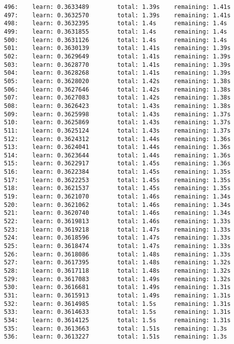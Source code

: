 \documentclass[11pt]{article}
\begin{document}
\begin{Verbatim}[commandchars=\\\{\}]
496:    learn: 0.3633489        total: 1.39s    remaining: 1.41s
497:    learn: 0.3632570        total: 1.39s    remaining: 1.41s
498:    learn: 0.3632395        total: 1.4s     remaining: 1.4s
499:    learn: 0.3631855        total: 1.4s     remaining: 1.4s
500:    learn: 0.3631126        total: 1.4s     remaining: 1.4s
501:    learn: 0.3630139        total: 1.41s    remaining: 1.39s
502:    learn: 0.3629649        total: 1.41s    remaining: 1.39s
503:    learn: 0.3628770        total: 1.41s    remaining: 1.39s
504:    learn: 0.3628268        total: 1.41s    remaining: 1.39s
505:    learn: 0.3628020        total: 1.42s    remaining: 1.38s
506:    learn: 0.3627646        total: 1.42s    remaining: 1.38s
507:    learn: 0.3627083        total: 1.42s    remaining: 1.38s
508:    learn: 0.3626423        total: 1.43s    remaining: 1.38s
509:    learn: 0.3625998        total: 1.43s    remaining: 1.37s
510:    learn: 0.3625869        total: 1.43s    remaining: 1.37s
511:    learn: 0.3625124        total: 1.43s    remaining: 1.37s
512:    learn: 0.3624312        total: 1.44s    remaining: 1.36s
513:    learn: 0.3624041        total: 1.44s    remaining: 1.36s
514:    learn: 0.3623644        total: 1.44s    remaining: 1.36s
515:    learn: 0.3622917        total: 1.45s    remaining: 1.36s
516:    learn: 0.3622384        total: 1.45s    remaining: 1.35s
517:    learn: 0.3622253        total: 1.45s    remaining: 1.35s
518:    learn: 0.3621537        total: 1.45s    remaining: 1.35s
519:    learn: 0.3621070        total: 1.46s    remaining: 1.34s
520:    learn: 0.3621062        total: 1.46s    remaining: 1.34s
521:    learn: 0.3620740        total: 1.46s    remaining: 1.34s
522:    learn: 0.3619813        total: 1.46s    remaining: 1.33s
523:    learn: 0.3619218        total: 1.47s    remaining: 1.33s
524:    learn: 0.3618596        total: 1.47s    remaining: 1.33s
525:    learn: 0.3618474        total: 1.47s    remaining: 1.33s
526:    learn: 0.3618086        total: 1.48s    remaining: 1.33s
527:    learn: 0.3617395        total: 1.48s    remaining: 1.32s
528:    learn: 0.3617118        total: 1.48s    remaining: 1.32s
529:    learn: 0.3617083        total: 1.49s    remaining: 1.32s
530:    learn: 0.3616681        total: 1.49s    remaining: 1.31s
531:    learn: 0.3615913        total: 1.49s    remaining: 1.31s
532:    learn: 0.3614985        total: 1.5s     remaining: 1.31s
533:    learn: 0.3614633        total: 1.5s     remaining: 1.31s
534:    learn: 0.3614125        total: 1.5s     remaining: 1.31s
535:    learn: 0.3613663        total: 1.51s    remaining: 1.3s
536:    learn: 0.3613227        total: 1.51s    remaining: 1.3s

\end{Verbatim}
\end{document}
